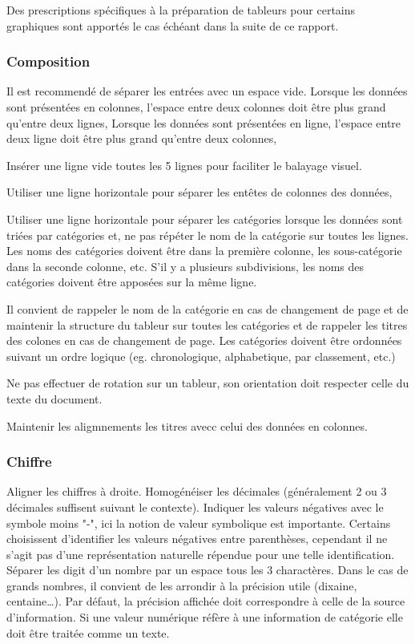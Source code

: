 \documentclass[a4paper,12pt]{article}
\begin{document}
\begin{multicols}{2}
Des prescriptions spécifiques à la préparation de tableurs pour certains graphiques sont apportés le cas échéant dans la suite de ce rapport.
\subsubsection{Composition}
\label{sec:org4c87242}
Il est recommendé de séparer les entrées avec un espace vide.
Lorsque les données sont présentées en colonnes, l'espace entre deux colonnes doit être plus grand qu'entre deux lignes,
Lorsque les données sont présentées en ligne, l'espace entre deux ligne doit être plus grand qu'entre deux colonnes,

Insérer une ligne vide toutes les 5 lignes pour faciliter le balayage visuel. \autocite{ErgonomieLinteractionHommesysteme2017a}

Utiliser une ligne horizontale pour séparer les entêtes de colonnes des données,

Utiliser une ligne horizontale pour séparer les catégories lorsque les données sont triées par catégories et, ne pas répéter le nom de la catégorie sur toutes les lignes. Les noms des catégories doivent être dans la première colonne, les sous-catégorie dans la seconde colonne, etc. S'il y a plusieurs subdivisions, les noms des catégories doivent être apposées sur la même ligne.

Il convient de rappeler le nom de la catégorie en cas de changement de page et de maintenir la structure du tableur sur toutes les catégories et de rappeler les titres des colones en cas de changement de page.
Les catégories doivent être ordonnées suivant un ordre logique (eg. chronologique, alphabetique, par classement, etc.)

Ne pas effectuer de rotation sur un tableur, son orientation doit respecter celle du texte du document.

Maintenir les aligmnements les titres avecc celui des données en colonnes.
\subsubsection{Chiffre}
\label{sec:orgae3b52e}
Aligner les chiffres à droite.
Homogénéiser les décimales (généralement 2 ou 3 décimales suffisent suivant le contexte).
Indiquer les valeurs négatives avec le symbole moins "-", ici la notion de valeur symbolique est importante. Certains choisissent d'identifier les valeurs négatives entre parenthèses, cependant il ne s'agit pas d'une représentation naturelle répendue pour une telle identification.
Séparer les digit d'un nombre par un espace tous les 3 charactères. Dans le cas de grands nombres, il convient de les arrondir à la précision utile (dixaine, centaine\ldots{}). Par défaut, la précision affichée doit correspondre à celle de la source d'information.
Si une valeur numérique réfère à une information de catégorie elle doit être traitée comme un texte.


\end{multicols}
\end{document}
